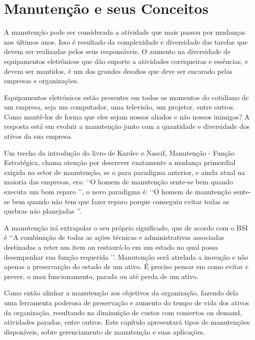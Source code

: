 \chapter{Manutenção e seus Conceitos}
\label{cap-manutencao}

A manutenção pode ser considerada a atividade que mais passou por mudanças nos últimos anos. Isso é resultado da complexidade e diversidade das tarefas que devem ser realizadas pelos seus responsáveis. O aumento na diversidade de equipamentos eletrônicos que dão suporte a atividades corriqueiras e essências, e devem ser mantidos, é um dos grandes desafios que deve ser encarado pelas empresas e organizações.

Equipamentos eletrônicos estão presentes em todos os momentos do cotidiano de um empresa, seja um computador, uma televisão, um projetor, entre outros. Como mantê-los de forma que eles sejam nossos aliados e não nossos inimigos? A resposta está em evoluir a manutenção junto com a quantidade e diversidade dos ativos da sua empresa.
	
Um trecho da introdução do livro de Kardec e Nascif, Manutenção - Função Estratégica, chama atenção por descrever exatamente a mudança primordial exigida no setor de manutenção, se o para paradigma anterior, e ainda atual na maioria das empresas, era: \lq\lq O homem de manutenção sente-se bem quando executa um bom reparo \rq\rq, o novo paradigma é: \lq\lq O homem de manutenção sente-se bem  quando não tem que fazer reparo porque conseguiu evitar todas as quebras não planejadas \rq\rq.
	
A manutenção irá extrapolar o seu próprio significado, que de acordo com o BSI \cite{british1993bs} é \lq\lq A combinação de todas as ações técnicas e administrativas associadas destinadas a reter um item ou restaurá-lo em um estado no qual possa desempenhar sua função requerida \rq\rq. Manutenção será atrelada a inovação e não apenas a preservarção do estado de um ativo. É preciso pensar em como evitar e prever, o mau funcionamento, parada ou até perda de um ativo.
	
Como então alinhar a manutenção aos objetivos da organização, fazendo dela uma ferramenta poderosa de preservação e aumento do tempo de vida dos ativos da organização, resultando na diminuição de custos com consertos on demand, atividades paradas, entre outros. Este capítulo apresentará tipos de manutenções disponíveis, sobre gerenciamento de manutenção e suas aplicações.


